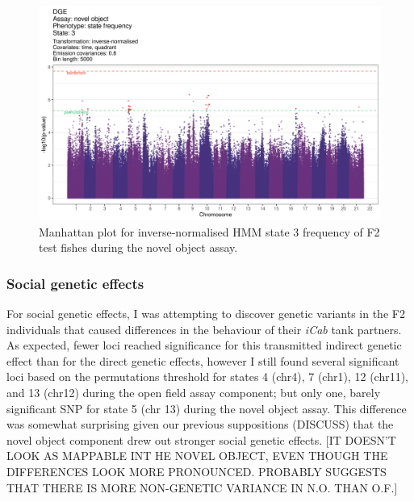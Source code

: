 \documentclass[
]{book}
\begin{document}
\begin{figure}
\includegraphics[width=1\linewidth]{figs/mikk_behaviour/manhattans/dge_no_3_time-quadrant} \caption{Manhattan plot for inverse-normalised HMM state 3 frequency of F2 test fishes during the novel object assay.}\label{fig:F2-man-dge-no-3}
\end{figure}

\hypertarget{social-genetic-effects-3}{%
\subsubsection{Social genetic effects}\label{social-genetic-effects-3}}

For social genetic effects, I was attempting to discover genetic variants in the F2 individuals that caused differences in the behaviour of their \emph{\textcolor{iCab_424B4D}{iCab}} tank partners. As expected, fewer loci reached significance for this transmitted indirect genetic effect than for the direct genetic effects, however I still found several significant loci based on the permutations threshold for states 4 (chr4), 7 (chr1), 12 (chr11), and 13 (chr12) during the open field assay component; but only one, barely significant SNP for state 5 (chr 13) during the novel object assay. This difference was somewhat surprising given our previous suppositions (DISCUSS) that the novel object component drew out stronger social genetic effects. {[}IT DOESN'T LOOK AS MAPPABLE INT HE NOVEL OBJECT, EVEN THOUGH THE DIFFERENCES LOOK MORE PRONOUNCED. PROBABLY SUGGESTS THAT THERE IS MORE NON-GENETIC VARIANCE IN N.O. THAN O.F.{]}
\end{document}

